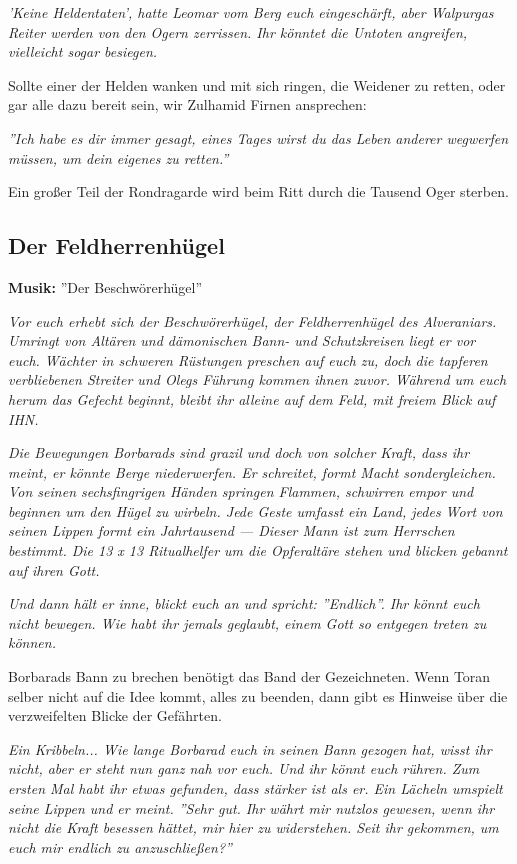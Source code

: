 \emph{'Keine Heldentaten', hatte Leomar vom Berg euch eingeschärft, aber Walpurgas Reiter werden von den Ogern zerrissen. Ihr könntet die Untoten angreifen, vielleicht sogar besiegen.}

Sollte einer der Helden wanken und mit sich ringen, die Weidener zu retten, oder gar alle dazu bereit sein, wir Zulhamid Firnen ansprechen:

\emph{''Ich habe es dir immer gesagt, eines Tages wirst du das Leben anderer wegwerfen müssen, um dein eigenes zu retten.''}

Ein großer Teil der Rondragarde wird beim Ritt durch die Tausend Oger sterben.

\subsection{Der Feldherrenhügel}
\textbf{Musik:} ''Der Beschwörerhügel''
 
\emph{Vor euch erhebt sich der Beschwörerhügel, der Feldherrenhügel des Alveraniars. Umringt von Altären und dämonischen Bann- und Schutzkreisen liegt er vor euch. Wächter in schweren Rüstungen preschen auf euch zu, doch die tapferen verbliebenen Streiter und Olegs Führung kommen ihnen zuvor. Während um euch herum das Gefecht beginnt, bleibt ihr alleine auf dem Feld, mit freiem Blick auf IHN.}

\emph{Die Bewegungen Borbarads sind grazil und doch von solcher Kraft, dass ihr meint, er könnte Berge niederwerfen. Er schreitet, formt Macht sondergleichen. Von seinen sechsfingrigen Händen springen Flammen, schwirren empor und beginnen um den Hügel zu wirbeln. Jede Geste umfasst ein Land, jedes Wort von seinen Lippen formt ein Jahrtausend --- Dieser Mann ist zum Herrschen bestimmt. Die 13 x 13 Ritualhelfer um die Opferaltäre stehen und blicken gebannt auf ihren Gott.}

\emph{Und dann hält er inne, blickt euch an und spricht: ''Endlich''. Ihr könnt euch nicht bewegen. Wie habt ihr jemals geglaubt, einem Gott so entgegen treten zu können.}

Borbarads Bann zu brechen benötigt das Band der Gezeichneten. Wenn Toran selber nicht auf die Idee kommt, alles zu beenden, dann gibt es Hinweise über die verzweifelten Blicke der Gefährten.

\emph{Ein Kribbeln... Wie lange Borbarad euch in seinen Bann gezogen hat, wisst ihr nicht, aber er steht nun ganz nah vor euch. Und ihr könnt euch rühren. Zum ersten Mal habt ihr etwas gefunden, dass stärker ist als er. Ein Lächeln umspielt seine Lippen und er meint. ''Sehr gut. Ihr währt mir nutzlos gewesen, wenn ihr nicht die Kraft besessen hättet, mir hier zu widerstehen. Seit ihr gekommen, um euch mir endlich zu anzuschließen?''}

